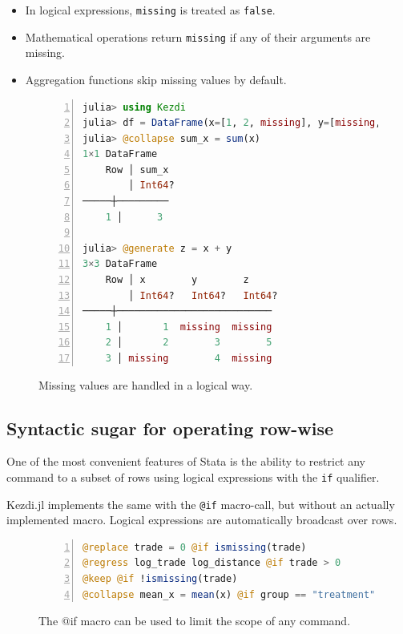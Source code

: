 \documentclass{juliacon}
\begin{document}
\begin{itemize}
	\item In logical expressions, \texttt{missing} is treated as \texttt{false}.
	\item Mathematical operations return \texttt{missing} if any of their arguments are missing.
	\item Aggregation functions skip missing values by default.
\end{itemize}


\begin{figure}[t]
\begin{lstlisting}[language = Julia, numbers=left, numberstyle=\tiny\color{gray}]
julia> using Kezdi
julia> df = DataFrame(x=[1, 2, missing], y=[missing, 3, 4])
julia> @collapse sum_x = sum(x)
1×1 DataFrame
	Row │ sum_x   
		│ Int64?  
─────┼─────────
	1 │      3

julia> @generate z = x + y
3×3 DataFrame
	Row │ x        y        z
		│ Int64?   Int64?   Int64?
─────┼───────────────────────────
	1 │       1  missing  missing
	2 │       2        3        5
	3 │ missing        4  missing
	\end{lstlisting}
	
\caption{Missing values are handled in a logical way.}
\label{fig:missing}
\end{figure}

\subsection{Syntactic sugar for operating row-wise}

One of the most convenient features of Stata is the ability to restrict any command to a subset of rows using logical expressions with the \texttt{if} qualifier.

Kezdi.jl implements the same with the \texttt{@if} macro-call, but without an actually implemented macro. Logical expressions are automatically broadcast over rows.

\begin{figure}[t]
\begin{lstlisting}[language = Julia, numbers=left, numberstyle=\tiny\color{gray}]
@replace trade = 0 @if ismissing(trade)
@regress log_trade log_distance @if trade > 0
@keep @if !ismissing(trade) 
@collapse mean_x = mean(x) @if group == "treatment"		
\end{lstlisting}
	
\caption{The @if macro can be used to limit the scope of any command.}
\label{fig:ifmacro}
\end{figure}
\end{document}
